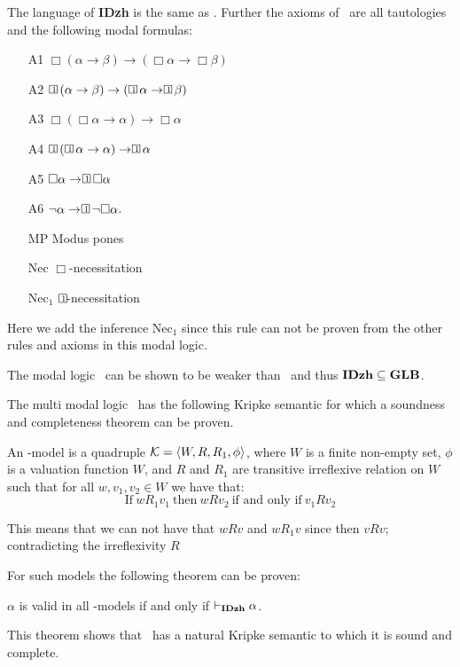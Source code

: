 \documentclass[../main.tex]{subfiles}
\begin{document}
\begin{defi}
	The language of \textbf{IDzh} is the same as \GLB. Further the axioms
	of \IDzh\ are all tautologies and the following modal formulas:
	\begin{enumerate}
		\item[A1]
			$\Box(\alpha\rightarrow\beta)\rightarrow(\Box\alpha\rightarrow\Box\beta)$
		\item[A2]
			$\OneBox(\alpha\rightarrow\beta)\rightarrow(\OneBox\alpha\rightarrow\OneBox\beta)$
		\item[A3] $\Box(\Box\alpha\rightarrow\alpha)\rightarrow\Box\alpha$
		\item[A4] $\OneBox(\OneBox\alpha\rightarrow\alpha)\rightarrow\OneBox\alpha$
		\item[A5] $\Box\alpha\rightarrow\OneBox\Box\alpha$
		\item[A6] $\neg\alpha\rightarrow\OneBox\neg\Box\alpha$.
		\item[MP] Modus pones 
		\item[Nec] $\Box$-necessitation
		\item[Nec$_1$] $\OneBox$-necessitation
	\end{enumerate}
	Here we add the inference Nec$_1$ since this rule can not be proven
	from the other rules and axioms in this modal logic.
\end{defi}
The modal logic \IDzh\ can be shown to be weaker than \GLB\ and thus
$\text{\textbf{IDzh}}\subseteq\text{\textbf{GLB}}$.

The multi modal logic \IDzh\ has the following Kripke semantic for which a soundness and
completeness theorem can be proven.
\begin{defi}
	An \IDzh-model is a quadruple $\mathcal{K}=\langle W,R,R_1,\phi\rangle$, where
	$W$ is a finite non-empty set, $\phi$ is a valuation function $W$, and
	$R$ and $R_1$ are transitive irreflexive relation on $W$ such that for
	all $w,v_1,v_2\in W$ we have that:
	\[\text{If}\ wR_1v_1\ \text{then}\ wRv_2\ \text{if and only if}\
	v_1Rv_2\]
\end{defi}
This means that we can not have that $wRv$ and $wR_1v$ since then $vRv$;
contradicting the irreflexivity $R$

For such models the following theorem can be proven:
\begin{thm}
	$\alpha$ is valid in all \IDzh-models if and only if
	$\vdash_{\text{\textbf{IDzh}}}\alpha$.
\end{thm}
This theorem shows that \IDzh\ has a natural Kripke semantic to which it is
sound and complete.
\end{document}
